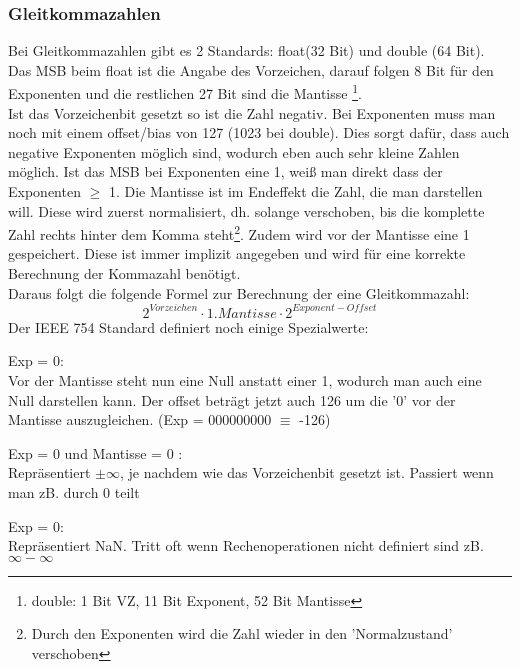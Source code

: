\documentclass[a4paper]{scrartcl}
\begin{document}
        \subsubsection{Gleitkommazahlen}
            Bei Gleitkommazahlen gibt es 2 Standards: float(32 Bit) und double (64 Bit). 
            Das MSB beim float ist die Angabe des Vorzeichen, darauf folgen 8 Bit für den Exponenten und die restlichen 27 Bit sind die Mantisse \footnote{double: 1 Bit VZ, 11 Bit Exponent, 52 Bit Mantisse}. \\
            Ist das Vorzeichenbit gesetzt so ist die Zahl negativ. Bei Exponenten muss man noch mit einem offset/bias von 127 (1023 bei double). Dies sorgt dafür, dass auch negative Exponenten
            möglich sind, wodurch eben auch sehr kleine Zahlen möglich. Ist das MSB bei Exponenten eine 1, weiß man direkt dass der Exponenten \(\geq\) 1. Die Mantisse ist im Endeffekt die Zahl, die man
            darstellen will. Diese wird zuerst normalisiert, dh. solange verschoben, bis die komplette Zahl rechts hinter dem Komma steht\footnote{Durch den Exponenten wird die Zahl wieder in den 'Normalzustand' verschoben}.
            Zudem wird vor der Mantisse eine 1 gespeichert. Diese ist immer implizit angegeben und wird für eine korrekte Berechnung der Kommazahl benötigt.\\
            Daraus folgt die folgende Formel zur Berechnung der eine Gleitkommazahl: 
            \begin{equation}
                2^{Vorzeichen} \cdot 1.Mantisse \cdot 2^{Exponent - Offset} 
            \end{equation}
            Der IEEE 754 Standard definiert noch einige Spezialwerte: 
            \begin{description}
                \item Exp = 0: \hfill \\
                    Vor der Mantisse steht nun eine Null anstatt einer 1, wodurch man auch eine Null darstellen kann. Der offset beträgt jetzt auch 126 um die '0' vor der Mantisse
                    auszugleichen. (Exp = 000000000 \(\equiv \) -126)
                \item Exp = 0 und Mantisse = 0 : \hfill \\
                    Repräsentiert \(\pm \infty\), je nachdem wie das Vorzeichenbit gesetzt ist. Passiert wenn man zB. durch 0 teilt 
                \item Exp = 0: \hfill \\
                    Repräsentiert  NaN. Tritt oft wenn Rechenoperationen nicht definiert sind zB. \(\infty - \infty\)
            \end{description}
            
\end{document}
